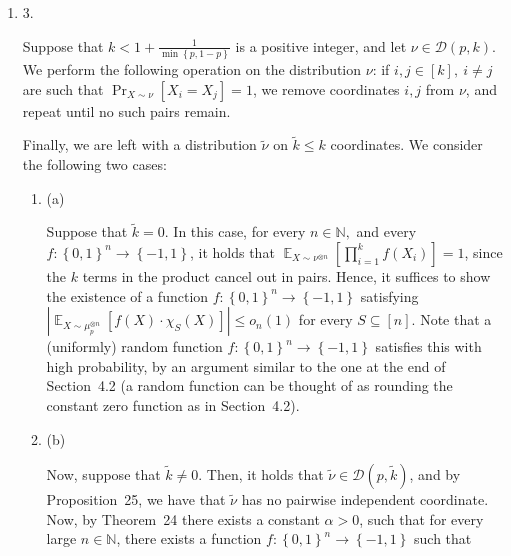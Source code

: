 \documentclass[10pt,a4paper]{article}
\begin{document}
\begin{enumerate}
\begin{enumerate}
\end{enumerate}


The result now follows by Theorem 33.\par





\item[] 
3. 


Suppose that $k<1+\frac{1}{\min\left\{p,1-p\right\}}$ is a positive integer, and let $\nu\in\mathcal{D}(p,k)$.
We perform the following operation on the distribution $\nu$:
if $i,j\in[k],\ i\not=j$ are such that $\Pr_{X\sim\nu}[X_{i}=X_{j}]=1$, we remove coordinates $i,j$ from $\nu$, and repeat until no such pairs remain.\par




Finally, we are left with a distribution $\tilde{\nu}$ on $\tilde{k}\leqslant k$ coordinates. We consider the following two cases:\par


\begin{enumerate}


\item[] 
(a) 


Suppose that $\tilde{k}=0$. In this case, for every $n\in\mathbb{N},$ and every $f:\left\{0,1\right\}^{n}\to\left\{-1,1\right\}$, it holds that $\mathop{\mathbb{E}}_{X\sim\nu^{\otimes n}}\left[\prod_{i=1}^{k}f(X_{i})\right]=1$, since the $k$ terms in the product cancel out in pairs.
Hence, it suffices to show the existence of a function $f:\left\{0,1\right\}^{n}\to\left\{-1,1\right\}$ satisfying $\left|\mathop{\mathbb{E}}_{X\sim\mu_{p}^{\otimes n}}\left[f(X)\cdot\chi_{S}(X)\right]\right|\leqslant o_{n}(1)$ for every $S\subseteq[n]$.
Note that a (uniformly) random function $f:\left\{0,1\right\}^{n}\to\left\{-1,1\right\}$ satisfies this with high probability, by an argument similar to the one at the end of Section 4.2 (a random function can be thought of as rounding the constant zero function as in Section 4.2).\par





\item[] 
(b) 


Now, suppose that $\tilde{k}\not=0$.
Then, it holds that $\tilde{\nu}\in\mathcal{D}(p,\tilde{k})$, and by Proposition 25, we have that $\tilde{\nu}$ has no pairwise independent coordinate.
Now, by Theorem 24 there exists a constant $\alpha>0$, such that for every large $n\in\mathbb{N}$, there exists a function $f:\left\{0,1\right\}^{n}\to\left\{-1,1\right\}$ such that\par



\end{enumerate}
\end{enumerate}
\end{document}
